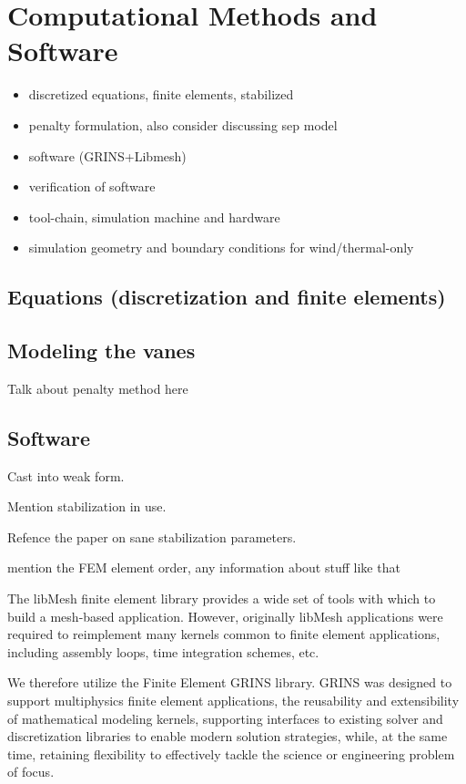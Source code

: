 \section{Computational Methods and Software}
\label{sec:software}

\begin{itemize}
\item discretized equations, finite elements, stabilized
\item penalty formulation, also consider discussing sep model
\item software (GRINS+Libmesh)
\item verification of software
\item tool-chain, simulation machine and hardware
\item simulation geometry and boundary conditions for wind/thermal-only
\end{itemize}

\subsection{Equations (discretization and finite elements)}

\subsection{Modeling the vanes}

Talk about penalty method here

\subsection{Software}

Cast into weak form. 

Mention stabilization in use. 

Refence the paper on sane stabilization parameters. 

mention the FEM element order, any information about stuff like that

The libMesh\cite{libmesh} finite element library
provides a wide set of tools with which to build a mesh-based
application. However, originally libMesh applications were required to
reimplement many kernels common to finite element applications,
including assembly loops, time integration schemes, etc. 

We therefore utilize the Finite Element GRINS library\cite{grins}.
GRINS was designed to support multiphysics finite element
applications, the reusability and extensibility of mathematical
modeling kernels, supporting interfaces to existing solver and
discretization libraries to enable modern solution strategies, while, at
the same time, retaining flexibility to effectively tackle the science
or engineering problem of focus. 

